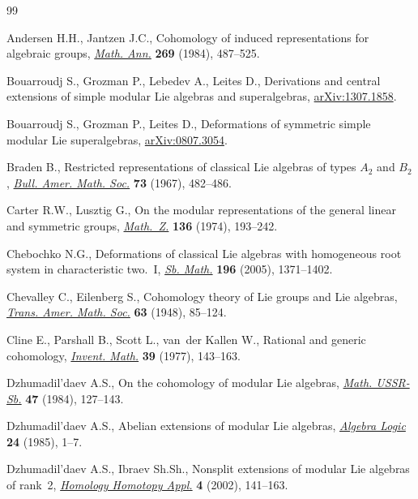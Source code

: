 \documentclass[10pt,a4paper]{amsart}
\numberwithin{equation}{section}
\begin{document}
\begin{thebibliography}{99}
\footnotesize\itemsep=0pt

Andersen H.H., Jantzen J.C., Cohomology of induced representations for
 algebraic groups, \href{https://doi.org/10.1007/BF01450762}{\textit{Math. Ann.}} \textbf{269} (1984), 487--525.

Bouarroudj S., Grozman P., Lebedev A., Leites D., Derivations and central
 extensions of simple modular {L}ie algebras and superalgebras,
 \href{https://arxiv.org/abs/1307.1858}{arXiv:1307.1858}.

Bouarroudj S., Grozman P., Leites D., Deformations of symmetric simple modular
 {L}ie superalgebras, \href{https://arxiv.org/abs/0807.3054}{arXiv:0807.3054}.

Braden B., Restricted representations of classical {L}ie algebras of types
 {$A_{2}$} and {$B_{2}$}, \href{https://doi.org/10.1090/S0002-9904-1967-11788-9}{\textit{Bull. Amer. Math. Soc.}} \textbf{73} (1967),
 482--486.

Carter R.W., Lusztig G., On the modular representations of the general linear
 and symmetric groups, \href{https://doi.org/10.1007/BF01214125}{\textit{Math.~Z.}} \textbf{136} (1974), 193--242.

Chebochko N.G., Deformations of classical {L}ie algebras with homogeneous root
 system in characteristic two.~{I}, \href{https://doi.org/10.1070/SM2005v196n09ABEH003647}{\textit{Sb. Math.}} \textbf{196} (2005),
 1371--1402.

Chevalley C., Eilenberg S., Cohomology theory of {L}ie groups and {L}ie
 algebras, \href{https://doi.org/10.2307/1990637}{\textit{Trans. Amer. Math. Soc.}} \textbf{63} (1948), 85--124.

Cline E., Parshall B., Scott L., van~der Kallen W., Rational and generic
 cohomology, \href{https://doi.org/10.1007/BF01390106}{\textit{Invent. Math.}} \textbf{39} (1977), 143--163.

Dzhumadil'daev A.S., On the cohomology of modular Lie algebras, \href{https://doi.org/10.1070/SM1984v047n01ABEH002634}{\textit{Math.
 USSR-Sb.}} \textbf{47} (1984), 127--143.

Dzhumadil'daev A.S., Abelian extensions of modular {L}ie algebras,
 \href{https://doi.org/10.1007/BF01978701}{\textit{Algebra Logic}} \textbf{24} (1985), 1--7.

Dzhumadil'daev A.S., Ibraev Sh.Sh., Nonsplit extensions of modular {L}ie algebras
 of rank~2, \href{https://doi.org/10.4310/hha.2002.v4.n2.a7}{\textit{Homology Homotopy Appl.}} \textbf{4} (2002), 141--163.


\end{thebibliography}
\end{document}
